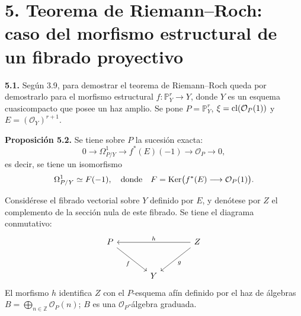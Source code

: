 
\providecommand{\sisi}[2]{#2}

\section*{5. Teorema de Riemann--Roch: caso del morfismo estructural de un fibrado proyectivo}

\textbf{5.1.} Según 3.9, para demostrar el teorema de Riemann--Roch queda por
demostrarlo para el morfismo estructural
\(f:\mathbb P^r_Y\longrightarrow Y\), donde \(Y\) es un esquema cuasicompacto
que posee un haz amplio. Se pone \(P=\mathbb P^r_Y\),
\(\xi=\operatorname{cl}(\mathcal O_P(1))\) y \(E=(\mathcal O_Y)^{r+1}\).

\textbf{Proposición 5.2.} Se tiene sobre \(P\) la sucesión exacta:
\[
0\longrightarrow\Omega^1_{P/Y}\longrightarrow f^*(E)(-1)\longrightarrow\mathcal O_P\longrightarrow0,
\]
es decir, se tiene un isomorfismo
\[
\Omega^1_{P/Y}\simeq F(-1),\quad\text{donde}\quad F=\operatorname{Ker}\bigl(f^*(E)\longrightarrow\mathcal O_P(1)\bigr).
\]

Considérese el fibrado vectorial sobre \(Y\) definido por \(E\), y denótese
por \(Z\) el complemento de la sección nula de este fibrado. Se tiene el
diagrama conmutativo:
\[
\begin{tikzcd}[column sep=large,row sep=large]
P \arrow[dr,"f"'] && Z \arrow[ll,"h"'] \arrow[dl,"g"]\\
& Y &
\end{tikzcd}
\]
El morfismo \(h\) identifica \(Z\) con el \(P\)-esquema afín definido por el
haz de álgebras
\(B=\bigoplus_{n\in\mathbb Z}\mathcal O_P(n)\); \(B\) es una
\(\mathcal O_P\)-álgebra graduada.

